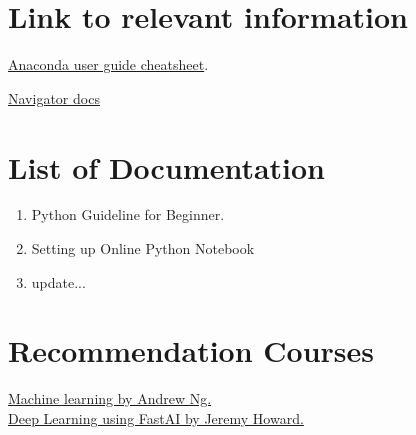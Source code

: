 \documentclass[a4paper,10pt]{article}
\begin{document}

\section{Link to relevant information}

\hspace{3ex}\href{https://docs.anaconda.com/anaconda/user-guide/cheatsheet/}{Anaconda user guide cheatsheet}.

\href{https://docs.anaconda.com/anaconda/navigator/}{Navigator docs}



\section{List of Documentation}

\begin{enumerate}
  \item Python Guideline for Beginner.
  \item Setting up Online Python Notebook
  \item update...
\end{enumerate}

\vspace{1cm}
\vspace{1cm}





\section{Recommendation Courses}

\href{https://www.coursera.org/learn/machine-learning}{Machine learning by Andrew Ng.}\\
\href{https://www.usfca.edu/data-institute/certificates/deep-learning-part-one}{Deep Learning using FastAI  by Jeremy Howard.}




\printbibliography
\end{document}
